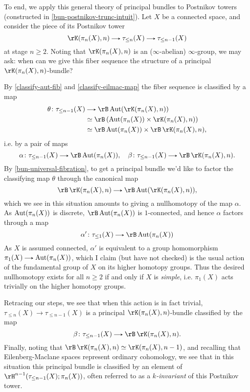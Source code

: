 \begin{nothing}
  \label{bun-postnikov-principal}
  To end, we apply this general theory of principal bundles to Postnikov towers (constructed in \cref{bun-postnikov-trunc-intuit}). Let $X$ be a connected space, and consider the piece of its Postnikov tower 
  \[
    \rK(\pi_n(X), n) \to \tau_{\le n}(X) \to \tau_{\le n-1}(X)
  \]
  at stage $n \ge 2$. Noting that $\rK(\pi_n(X),n)$ is an ($\infty$-abelian) $\infty$-group, we may ask: when can we give this fiber sequence the structure of a principal $\rK(\pi_n(X), n)$-bundle?

  By \cref{classify-aut-fib} and \cref{classify-eilmac-map} the fiber sequence is classified by a map
  \begin{align*}
    \theta \c \tau_{\le n-1}(X)
    &\to \rB \Aut(\rK(\pi_n(X),n)) \\
    &\iso \rB \l( \Aut(\pi_n(X)) \times \rK(\pi_n(X),n) \r) \\
    &\iso \rB \Aut(\pi_n(X)) \times \rB\,\rK(\pi_n(X),n),
  \end{align*}
  i.e. by a pair of maps 
  \[
    \alpha \c \tau_{\le n-1}(X) \to \rB \Aut(\pi_n(X)), \quad
    \beta \c \tau_{\le n-1}(X) \to \rB\,\rK(\pi_n(X),n).
  \]
  By \cref{bun-universal-fibration}, to get a principal bundle we'd like to factor the classifying map $\theta$ through the canonical map
  \[
    \rB\,\rK(\pi_n(X),n) \to \rB \Aut(\rK(\pi_n(X),n)),
  \]
  which we see in this situation amounts to giving a nullhomotopy of the map $\alpha$. As $\operatorname{Aut}(\pi_n(X))$ is discrete, $\rB \Aut(\pi_n(X))$ is $1$-connected, and hence $\alpha$ factors through a map
  \[
    \alpha' \c \tau_{\le 1}(X) \to \rB \Aut(\pi_n(X))
  \]
  As $X$ is assumed connected, $\alpha'$ is equivalent to a group homomorphism $\pi_1(X) \to \Aut(\pi_n(X))$, which I claim (but have not checked) is the usual action of the fundamental group of $X$ on its higher homotopy groups. Thus the desired nullhomotopy exists for all $n \ge 2$ if and only if $X$ is \emph{simple}, i.e. $\pi_1(X)$ acts trivially on the higher homotopy groups.

  Retracing our steps, we see that when this action is in fact trivial, $\tau_{\le n}(X) \to \tau_{\le n-1}(X)$ is a principal $\rK(\pi_n(X),n)$-bundle classified by the map
  \[
    \beta \c \tau_{\le n-1}(X) \to \rB\,\rK(\pi_n(X),n).
  \]
  Finally, noting that $\rB\,\rK(\pi_n(X),n) \iso \rK(\pi_n(X), n-1)$, and recalling that Eilenberg-Maclane spaces represent ordinary cohomology, we see that in this situation this principal bundle is classified by an element of $\rH^{n-1}(\tau_{\le n-1}(X); \pi_n(X))$, often referred to as a \emph{$k$-invariant} of this Postnikov tower.
\end{nothing}







